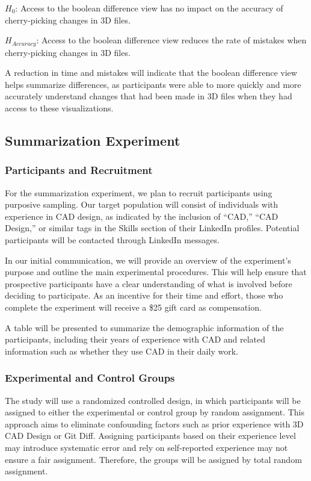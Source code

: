 \documentclass[sigconf,authorversion,nonacm]{acmart}
\begin{document}
$H_{0}$: Access to the boolean difference view has no impact on the accuracy of cherry-picking changes in 3D files.

$H_{Accuracy}$: Access to the boolean difference view reduces the rate of mistakes when cherry-picking changes in 3D files.

A reduction in time and mistakes will indicate that the boolean difference view helps summarize differences, as participants were able to more quickly and more accurately understand changes that had been made in 3D files when they had access to these visualizations.

\subsection{Summarization Experiment}
\subsubsection{Participants and Recruitment}
For the summarization experiment, we plan to recruit participants using purposive sampling. Our target population will consist of individuals with experience in CAD design, as indicated by the inclusion of ``CAD,'' ``CAD Design,''
or similar tags in the Skills section of their LinkedIn profiles. Potential participants will be contacted through LinkedIn messages.

In our initial communication, we will provide an overview of the experiment's purpose and outline the main experimental procedures.
This will help ensure that prospective participants have a clear understanding of what is involved before deciding to participate. As an incentive for their time and effort, those who complete the experiment will receive a \$25 gift card as compensation.

A table will be presented to summarize the demographic information of the participants, including their years of experience with CAD and related information such as whether they use CAD in their daily work.

\subsubsection{Experimental and Control Groups}

The study will use a randomized controlled design, in which participants will be assigned to either the experimental or control group by random assignment. This approach aims to eliminate confounding factors such as prior experience with 3D CAD Design or Git Diff. Assigning participants based on their experience level may introduce systematic error and rely on self-reported experience may not ensure a fair assignment. Therefore, the groups will be assigned by total random assignment.
\end{document}
